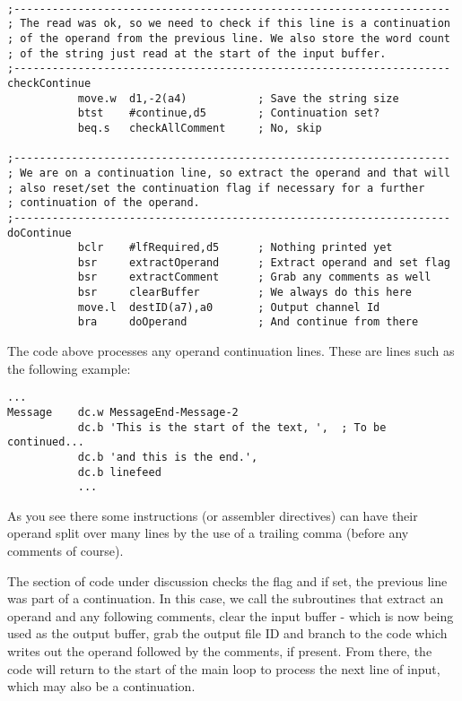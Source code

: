\begin{lstlisting}[firstnumber=last,caption={ASMReformat Source - Operand Continuations}]

;--------------------------------------------------------------------
; The read was ok, so we need to check if this line is a continuation
; of the operand from the previous line. We also store the word count
; of the string just read at the start of the input buffer.
;--------------------------------------------------------------------
checkContinue
           move.w  d1,-2(a4)           ; Save the string size	
           btst    #continue,d5        ; Continuation set?
           beq.s   checkAllComment     ; No, skip

;--------------------------------------------------------------------
; We are on a continuation line, so extract the operand and that will
; also reset/set the continuation flag if necessary for a further
; continuation of the operand.
;--------------------------------------------------------------------
doContinue
           bclr    #lfRequired,d5      ; Nothing printed yet
           bsr     extractOperand      ; Extract operand and set flag
           bsr     extractComment      ; Grab any comments as well
           bsr     clearBuffer         ; We always do this here
           move.l  destID(a7),a0       ; Output channel Id
           bra     doOperand           ; And continue from there
\end{lstlisting}

The code above processes any operand continuation lines. These are lines such as the following example:


\begin{lstlisting}[numbers=none,caption={Example Operand Continuation}]
           ...
Message    dc.w MessageEnd-Message-2
           dc.b 'This is the start of the text, ',  ; To be continued...
           dc.b 'and this is the end.',    
           dc.b linefeed           
           ...
\end{lstlisting}

As you see there some instructions (or assembler directives) can have their operand split over many lines by the use of a trailing comma (before any comments of course).

The section of code under discussion checks the flag and if set, the previous line was part of a continuation. In this case, we call the subroutines that extract an operand and any following comments, clear the input buffer - which is now being used as the output buffer, grab the output file  ID and branch to the code which writes out the operand followed by the comments, if present. From there, the code will return to the start of the main loop to process the next line of input, which may also be a continuation.

